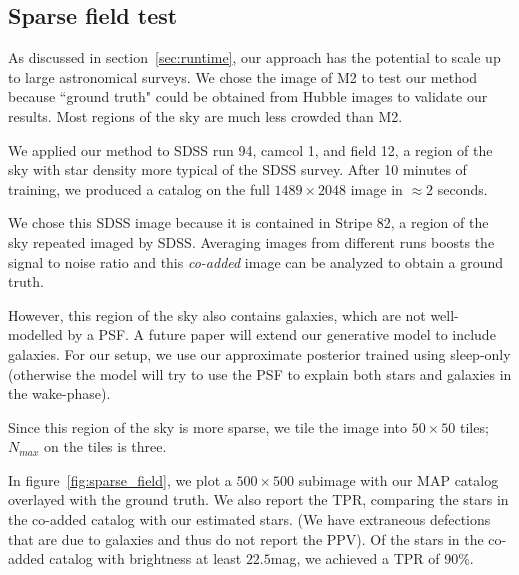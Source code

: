 
\subsection{Sparse field test}
As discussed in section~\ref{sec:runtime}, our approach has the potential 
to scale up to large astronomical surveys. We chose the image of M2 to 
test our method because ``ground truth" could be obtained from Hubble images 
to validate our results. Most regions of the sky are much less 
crowded than M2.

We applied our method to SDSS run 94, camcol 1, and field  12, 
a region of the sky with star density more typical of the SDSS survey. 
After 10 minutes of training, we produced a catalog on the full $1489\times 2048$ image in $\approx2$ seconds. 

We chose this SDSS image because it is contained in Stripe 82, a region of the sky repeated imaged by SDSS. Averaging images from different runs boosts the signal to noise ratio and this {\itshape co-added} image can be analyzed to obtain a ground truth. 

However, this region of the sky also contains galaxies, which are 
not well-modelled by a PSF. A future paper will extend our generative model to include galaxies. For our setup, we use our approximate posterior 
trained using sleep-only (otherwise the model will try to use the PSF to explain both stars and galaxies in the wake-phase). 

Since this region of the sky is more sparse, we tile the image into $50\times 50$ tiles; $N_{max}$ on the tiles is three. 

In figure~\ref{fig:sparse_field}, we plot a $500\times 500$ subimage with 
our MAP catalog overlayed with the ground truth. We also report the 
TPR, comparing the stars in the co-added catalog with our estimated stars. (We have extraneous defections that are due to galaxies and thus 
do not report the PPV). Of the stars in the co-added catalog with brightness at least $22.5$mag, we achieved a TPR of 90\%. 


